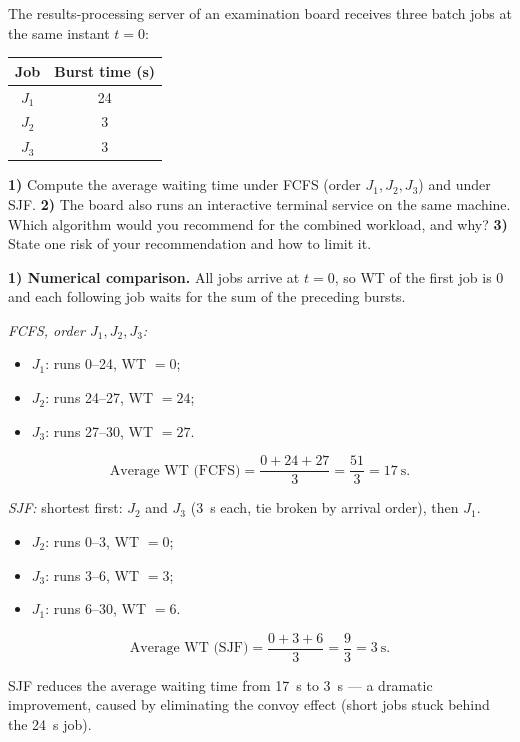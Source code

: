 \documentclass[11pt]{article}
\newcommand{\cle}[1]{{\popxbold\color{popdark}#1}}
\begin{document}
\begin{exoresolu}
The results-processing server of an examination board receives three batch jobs at the same instant $t = 0$:

\begin{center}
\begin{tabular}{|c|c|}
\hline
\rowcolor{popblueL} Job & Burst time (s) \\
\hline
$J_1$ & 24 \\
\hline
$J_2$ & 3 \\
\hline
$J_3$ & 3 \\
\hline
\end{tabular}
\end{center}

\textbf{1)} Compute the average waiting time under FCFS (order $J_1, J_2, J_3$) and under SJF. \textbf{2)} The board also runs an interactive terminal service on the same machine. Which algorithm would you recommend for the combined workload, and why? \textbf{3)} State one risk of your recommendation and how to limit it.

\tcblower
\textbf{1) Numerical comparison.} All jobs arrive at $t=0$, so WT of the first job is 0 and each following job waits for the sum of the preceding bursts.

\emph{FCFS, order $J_1, J_2, J_3$:}
\begin{itemize}
\item $J_1$: runs 0--24, WT $= 0$;
\item $J_2$: runs 24--27, WT $= 24$;
\item $J_3$: runs 27--30, WT $= 27$.
\end{itemize}
\[ \text{Average WT (FCFS)} = \frac{0+24+27}{3} = \frac{51}{3} = 17\ \text{s}. \]

\emph{SJF:} shortest first: $J_2$ and $J_3$ (3~s each, tie broken by arrival order), then $J_1$.
\begin{itemize}
\item $J_2$: runs 0--3, WT $= 0$;
\item $J_3$: runs 3--6, WT $= 3$;
\item $J_1$: runs 6--30, WT $= 6$.
\end{itemize}
\[ \text{Average WT (SJF)} = \frac{0+3+6}{3} = \frac{9}{3} = 3\ \text{s}. \]

SJF reduces the average waiting time from 17~s to 3~s — a dramatic improvement, caused by eliminating the \cle{convoy effect} (short jobs stuck behind the 24~s job).


\end{exoresolu}
\end{document}
